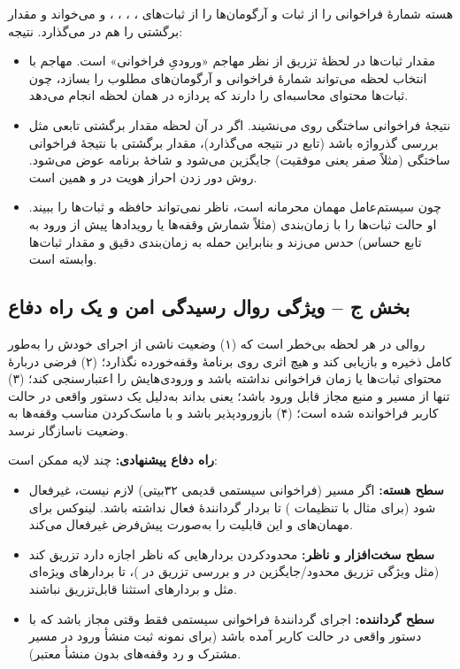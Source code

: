 هسته شمارهٔ فراخوانی را از ثبات  و آرگومان‌ها را از ثبات‌های ، ، ، ،  و  می‌خواند و مقدار برگشتی را هم در  می‌گذارد. نتیجه:
\begin{itemize}
  \item مقدار ثبات‌ها در لحظهٔ تزریق از نظر مهاجم «ورودیِ فراخوانی» است. مهاجم با انتخاب لحظه می‌تواند شمارهٔ فراخوانی و آرگومان‌های مطلوب را بسازد، چون ثبات‌ها محتوای محاسبه‌ای را دارند که پردازه در همان لحظه انجام می‌دهد.
  \item نتیجهٔ فراخوانی ساختگی روی  می‌نشیند. اگر  در آن لحظه مقدار برگشتی تابعی مثل بررسی گذرواژه باشد (تابع در  نتیجه می‌گذارد)، مقدار برگشتی با نتیجهٔ فراخوانی ساختگی (مثلاً صفر یعنی موفقیت) جایگزین می‌شود و شاخهٔ برنامه عوض می‌شود. روش دور زدن احراز هویت در  و  همین است.
  \item چون سیستم‌عامل مهمان محرمانه است، ناظر نمی‌تواند حافظه و ثبات‌ها را ببیند. او حالت ثبات‌ها را با زمان‌بندی (مثلاً شمارش وقفه‌ها یا رویدادها پیش از ورود به تابع حساس) حدس می‌زند و بنابراین حمله به زمان‌بندی دقیق و مقدار ثبات‌ها وابسته است.
\end{itemize}

\subsection*{بخش ج – ویژگی روال رسیدگی امن و یک راه دفاع}

روالی در هر لحظه بی‌خطر است که (۱) وضعیت‌ ناشی از اجرای خودش را به‌طور کامل ذخیره و بازیابی کند و هیچ اثری روی برنامهٔ وقفه‌خورده نگذارد؛ (۲) فرضی دربارهٔ محتوای ثبات‌ها یا زمان فراخوانی نداشته باشد و ورودی‌هایش را اعتبارسنجی کند؛ (۳) تنها از مسیر و منبع مجاز قابل ورود باشد؛ یعنی بداند به‌دلیل یک دستور واقعی در حالت کاربر فراخوانده شده است؛ (۴) بازورود‌پذیر باشد و با ماسک‌کردن مناسب وقفه‌ها به وضعیت ناسازگار نرسد.

\textbf{راه دفاع پیشنهادی:} چند لایه ممکن است:
\begin{itemize}
  \item \textbf{سطح هسته:} اگر مسیر  (فراخوانی سیستمی قدیمی ۳۲‌بیتی) لازم نیست، غیرفعال شود (برای مثال با تنظیمات ) تا بردار  گردانندهٔ فعال نداشته باشد. لینوکس برای مهمان‌های  و  این قابلیت را به‌صورت پیش‌فرض غیرفعال می‌کند.
  \item \textbf{سطح سخت‌افزار و ناظر:} محدودکردن بردارهایی که ناظر اجازه دارد تزریق کند (مثل ویژگی تزریق محدود/جایگزین در  و بررسی تزریق در )، تا بردارهای ویژه‌ای مثل  و بردارهای استثنا قابل‌تزریق نباشند.
  \item \textbf{سطح گرداننده:} اجرای گردانندهٔ فراخوانی سیستمی فقط وقتی مجاز باشد که با دستور واقعی در حالت کاربر آمده باشد (برای نمونه ثبت منشأ ورود در مسیر مشترک و رد وقفه‌های بدون منشأ معتبر).
\end{itemize}

